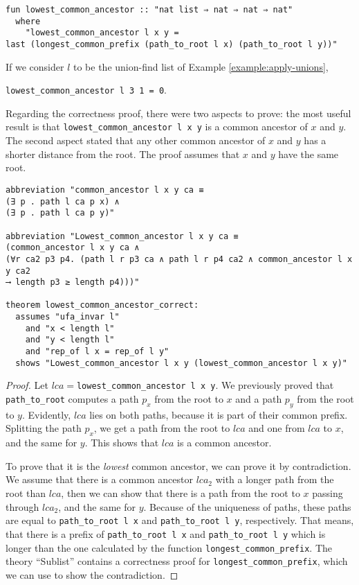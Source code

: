 \begin{lstlisting}
fun lowest_common_ancestor :: "nat list ⇒ nat ⇒ nat ⇒ nat"
  where
    "lowest_common_ancestor l x y =
last (longest_common_prefix (path_to_root l x) (path_to_root l y))"
\end{lstlisting}

\begin{exmp}
If we consider $l$ to be the union-find list of Example \ref{example:apply-unions},

\lstinline|lowest_common_ancestor l 3 1 = 0|.
\end{exmp}

Regarding the correctness proof, there were two aspects to prove: the most useful result is that \lstinline{lowest_common_ancestor l x y} is a common ancestor of $x$ and $y$. The second aspect stated that any other common ancestor of $x$ and $y$ has a shorter distance from the root. The proof assumes that $x$ and $y$ have the same root.

\begin{lstlisting}
abbreviation "common_ancestor l x y ca ≡
(∃ p . path l ca p x) ∧
(∃ p . path l ca p y)"

abbreviation "Lowest_common_ancestor l x y ca ≡
(common_ancestor l x y ca ∧
(∀r ca2 p3 p4. (path l r p3 ca ∧ path l r p4 ca2 ∧ common_ancestor l x y ca2
⟶ length p3 ≥ length p4)))"

theorem lowest_common_ancestor_correct:
  assumes "ufa_invar l"
    and "x < length l"
    and "y < length l"
    and "rep_of l x = rep_of l y"
  shows "Lowest_common_ancestor l x y (lowest_common_ancestor l x y)"
\end{lstlisting}

\begin{proof}
Let $lca =$\lstinline{lowest_common_ancestor l x y}. We previously proved that \lstinline{path_to_root} computes a path $p_x$ from the root to $x$ and a path $p_y$ from the root to $y$. Evidently, $lca$ lies on both paths, because it is part of their common prefix. Splitting the path $p_x$, we get a path from the root to $lca$ and one from $lca$ to $x$, and the same for $y$. This shows that $lca$ is a common ancestor.

To prove that it is the \emph{lowest} common ancestor, we can prove it by contradiction. We assume that there is a common ancestor $lca_2$ with a longer path from the root than $lca$, then we can show that there is a path from the root to $x$ passing through $lca_2$, and the same for $y$. Because of the uniqueness of paths, these paths are equal to \lstinline{path_to_root l x} and \lstinline{path_to_root l y}, respectively. That means, that there is a prefix of \lstinline{path_to_root l x} and \lstinline{path_to_root l y} which is longer than the one calculated by the function \lstinline{longest_common_prefix}. The theory ``Sublist'' contains a correctness proof for \lstinline{longest_common_prefix}, which we can use to show the contradiction.
\end{proof}

